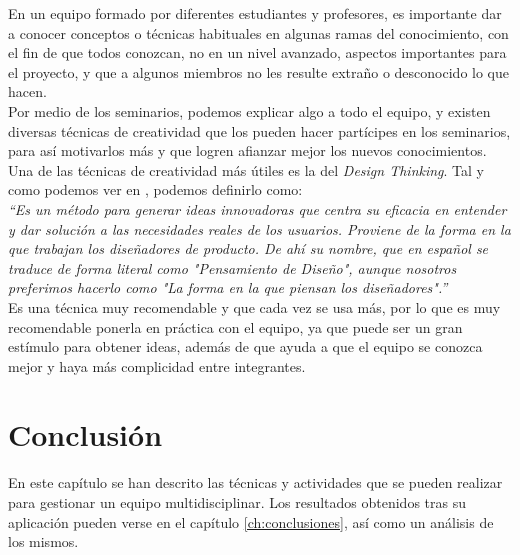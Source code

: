 En un equipo formado por diferentes estudiantes y profesores, es importante dar a conocer conceptos o técnicas habituales en algunas ramas del conocimiento, con el fin de que todos conozcan, no en un nivel avanzado, aspectos importantes para el proyecto, y que a algunos miembros no les resulte extraño o desconocido lo que hacen.\\

Por medio de los seminarios, podemos explicar algo a todo el equipo, y existen diversas técnicas de creatividad que los pueden hacer partícipes en los seminarios, para así motivarlos más y que logren afianzar mejor los nuevos conocimientos.\\

Una de las técnicas de creatividad más útiles es la del \textit{Design Thinking}. Tal y como podemos ver en \cite{designthinkinglink}, podemos definirlo como:\\

\textit{``Es un método para generar ideas innovadoras que centra su eficacia en entender y dar solución a las necesidades reales de los usuarios. Proviene de la forma en la que trabajan los diseñadores de producto. De ahí su nombre, que en español se traduce de forma literal como "Pensamiento de Diseño", aunque nosotros preferimos hacerlo como "La forma en la que piensan los diseñadores".''}\\

Es una técnica muy recomendable y que cada vez se usa más, por lo que es muy recomendable ponerla en práctica con el equipo, ya que puede ser un gran estímulo para obtener ideas, además de que ayuda a que el equipo se conozca mejor y haya más complicidad entre integrantes.

\section{Conclusión}
En este capítulo se han descrito las técnicas y actividades que se pueden realizar para gestionar un equipo multidisciplinar. Los resultados obtenidos tras su aplicación pueden verse en el capítulo \ref{ch:conclusiones}, así como un análisis de los mismos.
